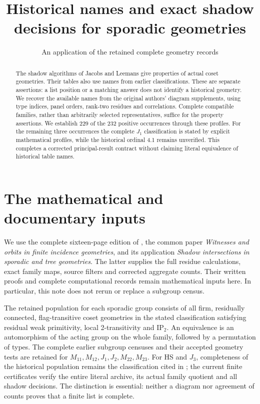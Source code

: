 \documentclass[11pt,a4paper]{article}
\title{Historical names and exact shadow decisions for sporadic geometries}
\author{An application of the retained complete geometry records}
\date{}
\newcommand{\IP}{\mathrm{IP}}
\begin{document}
\maketitle
\begin{abstract}
The shadow algorithms of Jacobs and Leemans give properties of actual
coset geometries. Their tables also use names from earlier classifications.
These are separate assertions: a list position or a matching answer does
not identify a historical geometry. We recover the available names from
the original authors' diagram supplements, using type indices, panel
orders, rank-two residues and correlations. Complete compatible families,
rather than arbitrarily selected representatives, suffice for the property
assertions. We establish 229 of the 232 positive occurrences through these profiles.
For the remaining three occurrences the complete $J_1$ classification is
stated by explicit mathematical profiles, while the historical ordinal
4.1 remains unverified. This completes a corrected principal-result
contract without claiming literal equivalence of historical table names.
\end{abstract}

\section{The mathematical and documentary inputs}
We use the complete sixteen-page edition of \cite{JL}, the common paper
\emph{Witnesses and orbits in finite incidence geometries}, and its
application \emph{Shadow intersections in sporadic and tree geometries}.
The latter supplies the full residue calculations, exact family maps,
source filters and corrected aggregate counts. Their written proofs and
complete computational records remain mathematical inputs here. In
particular, this note does not rerun or replace a subgroup census.

The retained population for each sporadic group consists of all firm,
residually connected, flag-transitive coset geometries in the stated
classification satisfying residual weak primitivity, local
2-transitivity and $\IP_2$. An equivalence is an automorphism of the
acting group on the whole family, followed by a permutation of types.
The complete earlier subgroup censuses and their accepted geometry tests
are retained for $M_{11},M_{12},J_1,J_2,M_{22},M_{23}$. For HS and $J_3$,
completeness of the historical population remains the classification
cited in \cite{JL}; the current finite certificates verify the entire
literal archive, its actual family quotient and all shadow decisions.
The distinction is essential: neither a diagram nor agreement of counts
proves that a finite list is complete.
\end{document}
